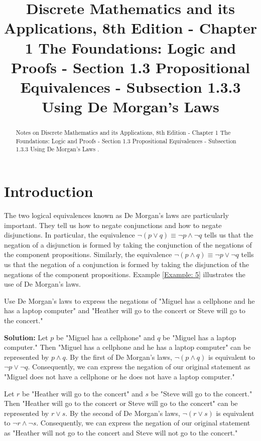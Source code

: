 \documentclass{Axon}
\title{Discrete Mathematics and its Applications, 8th Edition - Chapter 1 The Foundations: Logic and Proofs - Section 1.3 Propositional Equivalences - Subsection 1.3.3 Using De Morgan's Laws}
\begin{document}
\maketitle
\makeauthor
\begin{abstract}
Notes on Discrete Mathematics and its Applications, 8th Edition - Chapter 1 The Foundations: Logic and Proofs - Section 1.3 Propositional Equivalences - Subsection 1.3.3 Using De Morgan's Laws \cite{Rosen}.
\end{abstract}
\section{Introduction}
The two logical equivalences known as De Morgan's laws are particularly important. They tell us how to negate conjunctions and how to negate disjunctions. In particular, the equivalence \(\lnot (p \lor q) \equiv \lnot p \land \lnot q\) tells us that the negation of a disjunction is formed by taking the conjunction of the negations of the component propositions. Similarly, the equivalence \(\lnot(p \land q) \equiv \lnot p \lor \lnot q\) tells us that the negation of a conjunction is formed by taking the disjunction of the negations of the component propositions. Example \ref{Example: 5} illustrates the use of De Morgan's laws.

\begin{example}\label{Example: 5}
    Use De Morgan's laws to express the negations of "Miguel has a cellphone and he has a laptop computer" and "Heather will go to the concert or Steve will go to the concert."

    \noindent
    \textbf{Solution:}
    Let \(p\) be "Miguel has a cellphone" and \(q\) be "Miguel has a laptop computer." Then "Miguel has a cellphone and he has a laptop computer" can be represented by \(p \land q\). By the first of De Morgan's laws, \(\lnot (p \land q)\) is equivalent to \(\lnot p \lor \lnot q\). Consequently, we can express the negation of our original statement as "Miguel does not have a cellphone or he does not have a laptop computer."

    Let \(r\) be "Heather will go to the concert" and \(s\) be "Steve will go to the concert." Then "Heather will go to the concert or Steve will go to the concert" can be represented by \(r \lor s\). By the second of De Morgan's laws, \(\lnot (r \lor s)\) is equivalent to \(\lnot r \land \lnot s\). Consequently, we can express the negation of our original statement as "Heather will not go to the concert and Steve will not go to the concert."
\end{example}

\printbibliography
\end{document}
